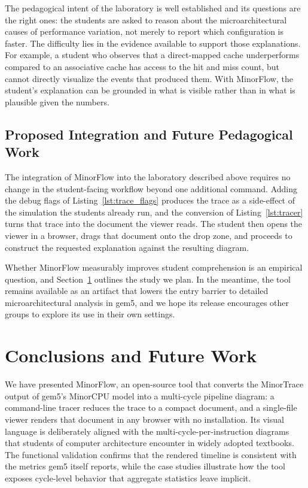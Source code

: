 \documentclass{ceurart}
\begin{document}
The pedagogical intent of the laboratory is well established and its questions are the right ones: the students are asked to reason about the microarchitectural causes of performance variation, not merely to report which configuration is faster. The difficulty lies in the evidence available to support those explanations. For example, a student who observes that a direct-mapped cache underperforms compared to an associative cache has access to the hit and miss count, but cannot directly visualize the events that produced them. With MinorFlow, the student's explanation can be grounded in what is visible rather than in what is plausible given the numbers. 

\subsection{Proposed Integration and Future Pedagogical Work}

The integration of MinorFlow into the laboratory described above requires no change in the student-facing workflow beyond one additional command. Adding the debug flags of Listing~\ref{lst:trace_flags} produces the trace as a side-effect of the simulation the students already run, and the conversion of Listing~\ref{lst:tracer} turns that trace into the document the viewer reads. The student then opens the viewer in a browser, drags that document onto the drop zone, and proceeds to construct the requested explanation against the resulting diagram.

Whether MinorFlow measurably improves student comprehension is an empirical question, and Section~\ref{sec:conclusions} outlines the study we plan. In the meantime, the tool remains available as an artifact that lowers the entry barrier to detailed microarchitectural analysis in gem5, and we hope its release encourages other groups to explore its use in their own settings.

\section{Conclusions and Future Work}
\label{sec:conclusions}

We have presented MinorFlow, an open-source tool that converts the MinorTrace output of gem5's MinorCPU model into a multi-cycle pipeline diagram: a command-line tracer reduces the trace to a compact document, and a single-file viewer renders that document in any browser with no installation. Its visual language is deliberately aligned with the multi-cycle-per-instruction diagrams that students of computer architecture encounter in widely adopted textbooks. The functional validation confirms that the rendered timeline is consistent with the metrics gem5 itself reports, while the case studies illustrate how the tool exposes cycle-level behavior that aggregate statistics leave implicit.
\end{document}
